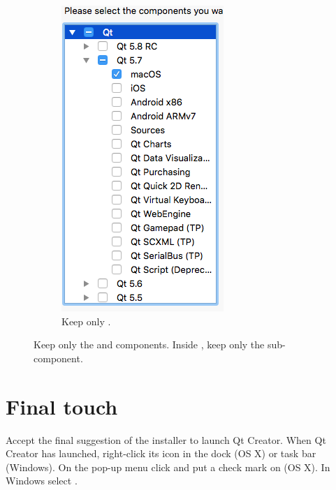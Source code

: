 \begin{figure} [h]
\begin{subfigure}{.333\textwidth}
  \includegraphics[width=.9\textwidth]{graphics/qt-setup-osx-3.png}
  \caption{Keep only .}
\end{subfigure}%
\caption{Keep only the  and  components. Inside , keep only the  sub-component.}
\label{fig:qt-setup-osx}
\end{figure}

\section{Final touch}
Accept the final suggestion of the installer to launch Qt Creator. When Qt Creator has launched, right-click its icon in the dock (OS X) or task bar (Windows). On the pop-up menu click  and put a check mark on  (OS X). In Windows select . 

